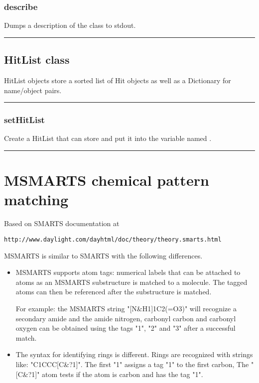 \begin{itemize}
\subsection{describe}

Dumps a description of the class to stdout.

\rule{6in}{0.01cm}\par
{}\par
\section{HitList class}
  HitList objects store a sorted list of Hit objects as well as a Dictionary for name/object pairs.

\rule{6in}{0.01cm}\par
{}\par
\subsection{setHitList}
  \par
  Create a HitList that can store  and put it into the variable named .

\rule{6in}{0.01cm}\par
{}\par
\chapter{MSMARTS chemical pattern matching}

Based on SMARTS documentation at 
\begin{verbatim}
http://www.daylight.com/dayhtml/doc/theory/theory.smarts.html
\end{verbatim}

MSMARTS is similar to SMARTS with the following differences.
\begin{itemize}
	\item MSMARTS supports atom tags: numerical labels that can be attached to atoms as an MSMARTS substructure is matched to a molecule. The tagged atoms can then be referenced after the substructure is matched.

	For example: the MSMARTS string "[N\&H1]1C2(=O3)" will recognize a secondary amide and the amide nitrogen, carbonyl carbon and carbonyl oxygen can be obtained using the tags "1", "2" and "3" after a successful match.
	\item The syntax for identifying rings is different. Rings are recognized with strings like: "C1CCC[C\&?1]".  The first "1" assigns a tag "1" to the first carbon, The "[C\&?1]" atom tests if the atom is carbon and has the tag "1".
\end{itemize}


\end{itemize}
